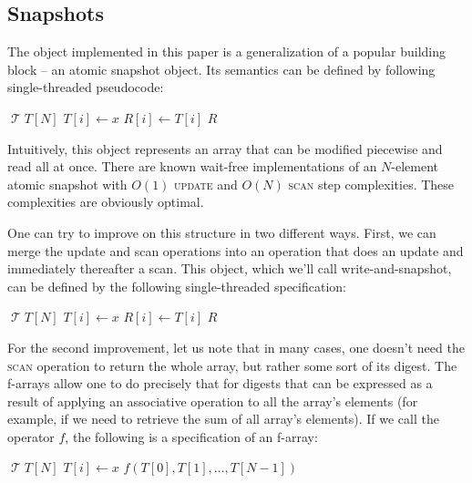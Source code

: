\documentclass[a4paper,11pt]{article}
\def\T{\ensuremath{\operatorname{\mathcal{T}}}\text{ }}
\newcommand{\fn}[1]{\textsc{#1}}
\begin{document}
\subsection{Snapshots}

The object implemented in this paper is a generalization of a popular building block -- an atomic snapshot
object\cite{snapshot-idea}. Its semantics can be defined by following single-threaded pseudocode:

\begin{algorithmic}[1]
\State \T $T[N]$
	\State $T[i] \gets x$
\EndFunction
{}
		\State $R[i] \gets T[i]$
	\EndFor
	\State\Return $R$
\EndFunction
\end{algorithmic}

Intuitively, this object represents an array that can be modified piecewise and read all at once.
There are known wait-free implementations of an $N$-element atomic snapshot with $O(1)$ \fn{update} and $O(N)$ \fn{scan} step complexities\cite{snapshot-impl}. These complexities are obviously
optimal.

One can try to improve on this structure in two different ways. First, we can merge the update and scan operations
into an operation that does an update and immediately thereafter a scan. This object, which we'll call write-and-snapshot\cite{write-and-snap}, can be defined by the following single-threaded specification:

\begin{algorithmic}[1]
\State \T $T[N]$
	\State $T[i] \gets x$
		\State $R[i] \gets T[i]$
	\EndFor
	\State\Return $R$
\EndFunction
\end{algorithmic}

For the second improvement, let us note that in many cases, one doesn't need the \fn{scan} operation to return the whole array, but rather some sort of its digest. The f-arrays\cite{f-array} allow one to do precisely that for digests that can be expressed as
a result of applying an associative operation to all the array's elements (for example, if we need to retrieve the sum of all array's elements). If we call the operator $f$, the following is a specification of an f-array:

\begin{algorithmic}[1]
\State \T $T[N]$
	\State $T[i] \gets x$
\EndFunction
{}
	\State\Return $f(T[0], T[1], \ldots, T[N-1])$
\EndFunction
\end{algorithmic}
\end{document}
